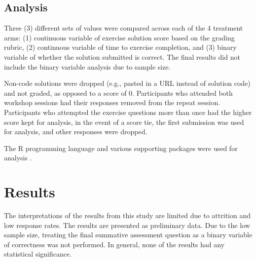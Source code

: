 \documentclass[acmsmall]{acmart}
\begin{document}
\subsection{Analysis}

Three (3) different sets of values were compared across each of the 4 treatment arms:
(1) continuous variable of exercise solution score based on the grading rubric,
(2) continuous variable of time to exercise completion, and
(3) binary variable of whether the solution submitted is correct.
The final results did not include the binary variable analysis due to sample size.

Non-code solutions were dropped (e.g., pasted in a URL instead of solution code)
and not graded, as opposed to a score of 0.
Participants who attended both workshop sessions had their responses removed from the repeat session.
Participants who attempted the exercise questions more than once had the higher score kept for analysis,
in the event of a score tie, the first submission was used for analysis,
and other responses were dropped.

The R programming language and various supporting packages were used for analysis
\cite{allaireRmarkdownDynamicDocuments2021a, chenVennDiagramGenerateHighresolution2021a, dahlXtableExportTables2019b, firkeJanitorSimpleTools2021b, ginnQualtRicsDownloadQualtrics2021c, grolemundDatesTimesMade2011b, henryPurrrFunctionalProgramming2020b, henryTidyselectSelectSet2021a, hesterFsCrossplatformFile2021b, hesterGlueInterpretedString2021b, mullerHereSimplerWay2020b, mullerTibbleSimpleData2021b, oomsJsonlitePackagePractical2014b, oomsWritexlExportData2021b, wickhamDplyrGrammarData2021b, wickhamGgplot2ElegantGraphics2016b, wickhamReadrReadRectangular2021b, wickhamReadxlReadExcel2019, wickhamRvestEasilyHarvest2021b, wickhamStringrSimpleConsistent2019b, wickhamTidyrTidyMessy2021b, wickhamWelcomeTidyverse2019c, xieDynamicDocumentsKnitr2015a, xieKnitrComprehensiveTool2014a, xieKnitrGeneralpurposePackage2021a, xieMarkdownCookbook2020a, xieMarkdownDefinitiveGuide2018a, rcoreteamLanguageEnvironmentStatistical2021}.


\section{Results}

The interpretations of the results from this study are limited due to attrition and low response rates.
The results are presented as preliminary data.
Due to the low sample size, treating the final summative assessment question as a binary variable of
correctness was not performed.
In general, none of the results had any statistical significance.
\end{document}
